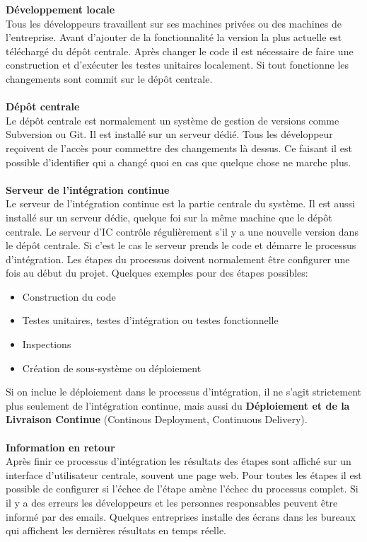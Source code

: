 \textbf{Développement locale}\\
Tous les développeurs travaillent sur ses machines privées ou des machines de l'entreprise. Avant d'ajouter de la fonctionnalité la version la plus actuelle est téléchargé du dépôt centrale. Après changer le code il est nécessaire de faire une construction et d'exécuter les testes unitaires localement. Si tout fonctionne les changements sont commit sur le dépôt centrale.\\\\
\textbf{Dépôt centrale}\\
Le dépôt centrale est normalement un système de gestion de versions comme Subversion ou Git. Il est installé sur un serveur dédié. Tous les développeur reçoivent de l'accès pour commettre des changements là dessus. Ce faisant il est possible d'identifier qui a changé quoi en cas que quelque chose ne marche plus.\\\\
\textbf{Serveur de l'intégration continue} \\
Le serveur de l'intégration continue est la partie centrale du système. Il est aussi installé sur un serveur dédie, quelque foi sur la même machine que le dépôt centrale. Le serveur d'IC contrôle régulièrement s'il y a une nouvelle version dans le dépôt centrale. Si c'est le cas le serveur prends le code et démarre le processus d'intégration. Les étapes du processus doivent normalement être configurer une fois au début du projet. Quelques exemples pour des étapes possibles:
\begin{itemize}
\item Construction du code
\item Testes unitaires, testes d'intégration ou testes fonctionnelle
\item Inspections
\item Création de sous-système ou déploiement
\end{itemize}
Si on inclue le déploiement dans le processus d'intégration, il ne s'agit strictement plus seulement de l'intégration continue, mais aussi du \textbf{Déploiement et de la Livraison Continue} (Continous Deployment, Continuous Delivery). 
\\\\
\textbf{Information en retour}\\
Après finir ce processus d'intégration les résultats des étapes sont affiché sur un interface d'utilisateur centrale, souvent une page web. Pour toutes les étapes il est possible de configurer si l'échec de l'étape amène l'échec du processus complet. Si il y a des erreurs les développeurs et les personnes responsables peuvent être informé par des emails. Quelques entreprises installe des écrans dans les bureaux qui affichent les dernières résultats en temps réelle.\\
